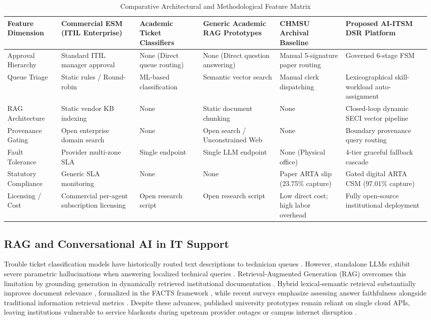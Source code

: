 \documentclass[conference]{IEEEtran}
\begin{document}
\begin{table}[t]
\caption{Comparative Architectural and Methodological Feature Matrix}
\label{tab1}
\centering
\begin{tabularx}{\textwidth}{lXXXXX}
\toprule
\textbf{Feature Dimension} & \textbf{Commercial ESM (ITIL Enterprise)} & \textbf{Academic Ticket Classifiers} & \textbf{Generic Academic RAG Prototypes} & \textbf{CHMSU Archival Baseline} & \textbf{Proposed AI-ITSM DSR Platform} \\
\midrule
Approval Hierarchy & Standard ITIL manager approval \cite{ref6} & None (Direct queue routing) & None (Direct question answering) & Manual 5-signature paper routing & Governed 6-stage FSM \\
Queue Triage & Static rules / Round-robin & ML-based classification \cite{ref19} & Semantic vector search \cite{ref20} & Manual clerk dispatching & Lexicographical skill-workload auto-assignment \\
RAG Architecture & Static vendor KB indexing & None & Static document chunking & None & Closed-loop dynamic SECI vector pipeline \\
Provenance Gating & Open enterprise domain search & None & Open search / Unconstrained Web & None & Boundary provenance query routing \\
Fault Tolerance & Provider multi-zone SLA & Single endpoint & Single LLM endpoint & None (Physical office) & 4-tier graceful fallback cascade \\
Statutory Compliance & Generic SLA monitoring & None & None & Paper ARTA slip (23.75\% capture) & Gated digital ARTA CSM (97.01\% capture) \\
Licensing / Cost & Commercial per-agent subscription licensing \cite{ref2} & Open research script & Open research script & Low direct cost; high labor overhead & Fully open-source institutional deployment \\
\bottomrule
\end{tabularx}
\end{table}

\subsection{RAG and Conversational AI in IT Support}
Trouble ticket classification models have historically routed text descriptions to technician queues \cite{ref19}. However, standalone LLMs exhibit severe parametric hallucinations when answering localized technical queries \cite{ref9}. Retrieval-Augmented Generation (RAG) overcomes this limitation by grounding generation in dynamically retrieved institutional documentation \cite{ref4, ref20}. Hybrid lexical-semantic retrieval substantially improves document relevance \cite{ref8, ref21}, formalized in the FACTS framework \cite{ref22}, while recent surveys emphasize assessing answer faithfulness alongside traditional information retrieval metrics \cite{ref10}. Despite these advances, published university prototypes remain reliant on single cloud APIs, leaving institutions vulnerable to service blackouts during upstream provider outages or campus internet disruption \cite{ref20}.
\end{document}
